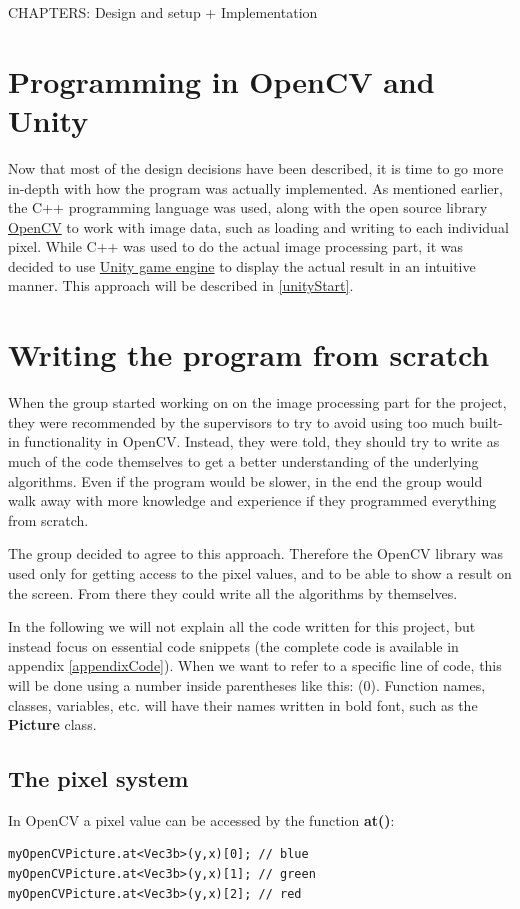 CHAPTERS: Design and setup + Implementation

\section{Programming in OpenCV and Unity}
Now that most of the design decisions have been described, it is time to go more in-depth with how the program was actually implemented. As mentioned earlier, the C++ programming language was used, along with the open source library \href{http://opencv.org/}{OpenCV} to work with image data, such as loading and writing to each individual pixel. While C++ was used to do the actual image processing part, it was decided to use \href{http://unity3d.com/}{Unity game engine} to display the actual result in an intuitive manner. This approach will be described in \ref{unityStart}.

\section{Writing the program from scratch}
When the group started working on on the image processing part for the project, they were recommended by the supervisors to try to avoid using too much built-in functionality in OpenCV. Instead, they were told, they should try to write as much of the code themselves to get a better understanding of the underlying algorithms. Even if the program would be slower, in the end the group would walk away with more knowledge and experience if they programmed everything from scratch.

The group decided to agree to this approach. Therefore the OpenCV library was used only for getting access to the pixel values, and to be able to show a result on the screen. From there they could write all the algorithms by themselves.

In the following we will not explain all the code written for this project, but instead focus on essential code snippets (the complete code is available in appendix \ref{appendixCode}). When we want to refer to a specific line of code, this will be done using a number inside parentheses like this: (0). Function names, classes, variables, etc. will have their names written in bold font, such as the \textbf{Picture} class.

\subsection{The pixel system}
In OpenCV a pixel value can be accessed by the function \textbf{at()}:
\begin{lstlisting}
myOpenCVPicture.at<Vec3b>(y,x)[0]; // blue
myOpenCVPicture.at<Vec3b>(y,x)[1]; // green
myOpenCVPicture.at<Vec3b>(y,x)[2]; // red
\end{lstlisting}


